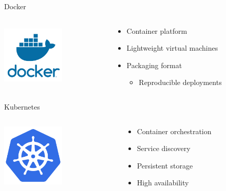 \documentclass[14pt]{beamer}
\begin{document}
  \begin{frame}{Docker}
    \begin{columns}[c]
      \begin{column}{.3\textwidth}
          \includegraphics[width=3cm,height=3cm]{images/docker_logo.png}
      \end{column}
      \begin{column}{.7\textwidth}
        \begin{itemize}
          \item Container platform
          \item Lightweight virtual machines
          \item Packaging format
          \begin{itemize}
            \item Reproducible deployments
          \end{itemize}
        \end{itemize}
      \end{column}
    \end{columns}
  \end{frame}

  \begin{frame}{Kubernetes}
    \begin{columns}[c]
      \begin{column}{.3\textwidth}
          \includegraphics[width=3cm,height=3cm]{images/kubernetes_logo.png}
      \end{column}
      \begin{column}{.7\textwidth}
        \begin{itemize}
          \item Container orchestration
          \item Service discovery
          \item Persistent storage
          \item High availability
        \end{itemize}
      \end{column}
    \end{columns}
  \end{frame}
\end{document}
